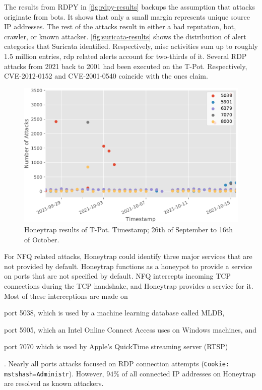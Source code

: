 The results from RDPY in \autoref{fig:rdpy-results} backups the assumption that attacks originate from bots.
It shows that only a small margin represents unique source IP addresses.
The rest of the attacks result in either a bad reputation, bot, crawler, or known attacker.
\autoref{fig:suricata-results} shows the distribution of alert categories that Suricata identified.
Respectively, misc activities sum up to roughly $1.5$ million entries, \ac{rdp} related alerts account for two-thirds of it.
Several RDP attacks from 2021 back to 2001 had been executed on the T-Pot.
Respectively, CVE-2012-0152 and CVE-2001-0540 coincide with the ones \citet{Kelly2021} claim.

\begin{figure}
    \centering
    \includegraphics[width=\textwidth]{figures/tpot-honeytrap-port.pdf}
    \caption[Honeytrap results of T-Pot]{
        Honeytrap results of T-Pot.
        Timestamp; 26th of September to 16th of October.
    }
    \label{fig:honeytrap-results}
\end{figure}

For NFQ related attacks, Honeytrap could identify three major services that are not provided by default.
Honeytrap functions as a honeypot to provide a service on ports that are not specified by default.
NFQ intercepts incoming TCP connections during the TCP handshake, and Honeytrap provides a service for it.
Most of these interceptions are made on
\begin{enumerate*}[label=(\roman*)]
    \item port 5038, which is used by a machine learning database called MLDB,
    \item port 5905, which an Intel Online Connect Access uses on Windows machines, and
    \item port 7070 which is used by Apple's QuickTime streaming server (RTSP)
\end{enumerate*}.
Nearly all ports attacks focused on RDP connection attempts (\verb|Cookie: mstshash=Administr|).
However, $94\%$ of all connected IP addresses on Honeytrap are resolved as known attackers.

